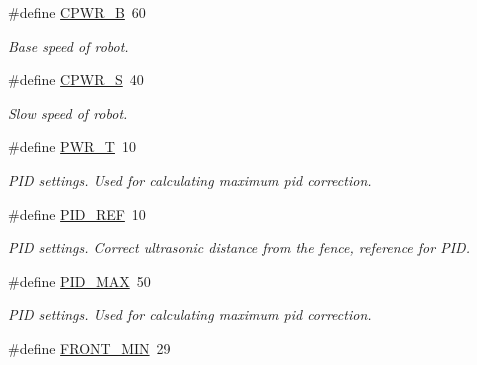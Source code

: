 \begin{DoxyCompactItemize}
\item 
\hypertarget{fence_8nxc_a738b9657b067e383cd066d4c7ca6f576}{
\#define \hyperlink{fence_8nxc_a738b9657b067e383cd066d4c7ca6f576}{CPWR\_\-B}~60}
\label{fence_8nxc_a738b9657b067e383cd066d4c7ca6f576}

\begin{DoxyCompactList}\small\item\em Base speed of robot. \item\end{DoxyCompactList}\item 
\hypertarget{fence_8nxc_ae382ea7d9a3437076c5616056836377a}{
\#define \hyperlink{fence_8nxc_ae382ea7d9a3437076c5616056836377a}{CPWR\_\-S}~40}
\label{fence_8nxc_ae382ea7d9a3437076c5616056836377a}

\begin{DoxyCompactList}\small\item\em Slow speed of robot. \item\end{DoxyCompactList}\item 
\hypertarget{fence_8nxc_a542a0090a7c37b6404cf8ba31d59f57d}{
\#define \hyperlink{fence_8nxc_a542a0090a7c37b6404cf8ba31d59f57d}{PWR\_\-T}~10}
\label{fence_8nxc_a542a0090a7c37b6404cf8ba31d59f57d}

\begin{DoxyCompactList}\small\item\em PID settings. Used for calculating maximum pid correction. \item\end{DoxyCompactList}\item 
\hypertarget{fence_8nxc_a211c307420126f39f228195cf77ae83c}{
\#define \hyperlink{fence_8nxc_a211c307420126f39f228195cf77ae83c}{PID\_\-REF}~10}
\label{fence_8nxc_a211c307420126f39f228195cf77ae83c}

\begin{DoxyCompactList}\small\item\em PID settings. Correct ultrasonic distance from the fence, reference for PID. \item\end{DoxyCompactList}\item 
\hypertarget{fence_8nxc_a2ded3bab320b6ac387798d39189fb505}{
\#define \hyperlink{fence_8nxc_a2ded3bab320b6ac387798d39189fb505}{PID\_\-MAX}~50}
\label{fence_8nxc_a2ded3bab320b6ac387798d39189fb505}

\begin{DoxyCompactList}\small\item\em PID settings. Used for calculating maximum pid correction. \item\end{DoxyCompactList}\item 
\hypertarget{fence_8nxc_ac9341f36c8b85c8d70f06973c2d9a5bd}{
\#define \hyperlink{fence_8nxc_ac9341f36c8b85c8d70f06973c2d9a5bd}{FRONT\_\-MIN}~29}
\label{fence_8nxc_ac9341f36c8b85c8d70f06973c2d9a5bd}


\end{DoxyCompactItemize}
